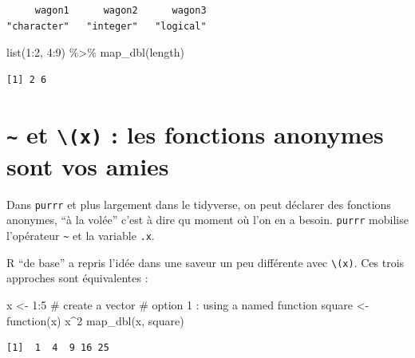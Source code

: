 \documentclass[
  letterpaper,
  DIV=11,
  numbers=noendperiod]{scrreprt}
\newenvironment{Shaded}{\begin{snugshade}}{\end{snugshade}}
\newcommand{\CommentTok}[1]{\textcolor[rgb]{0.37,0.37,0.37}{#1}}
\newcommand{\ControlFlowTok}[1]{\textcolor[rgb]{0.00,0.23,0.31}{#1}}
\newcommand{\DecValTok}[1]{\textcolor[rgb]{0.68,0.00,0.00}{#1}}
\newcommand{\FunctionTok}[1]{\textcolor[rgb]{0.28,0.35,0.67}{#1}}
\newcommand{\NormalTok}[1]{\textcolor[rgb]{0.00,0.23,0.31}{#1}}
\newcommand{\OtherTok}[1]{\textcolor[rgb]{0.00,0.23,0.31}{#1}}
\newcommand{\SpecialCharTok}[1]{\textcolor[rgb]{0.37,0.37,0.37}{#1}}
\begin{document}
\begin{verbatim}
     wagon1      wagon2      wagon3 
"character"   "integer"   "logical" 
\end{verbatim}

\begin{Shaded}
\begin{Highlighting}[]
\FunctionTok{list}\NormalTok{(}\DecValTok{1}\SpecialCharTok{:}\DecValTok{2}\NormalTok{, }\DecValTok{4}\SpecialCharTok{:}\DecValTok{9}\NormalTok{) }\SpecialCharTok{\%\textgreater{}\%} \FunctionTok{map\_dbl}\NormalTok{(length)}
\end{Highlighting}
\end{Shaded}

\begin{verbatim}
[1] 2 6
\end{verbatim}

\hypertarget{et-x-les-fonctions-anonymes-sont-vos-amies}{%
\section{\texorpdfstring{\texttt{\textasciitilde{}} et
\texttt{\textbackslash{}(x)} : les fonctions anonymes sont vos
amies}{\textasciitilde{} et \textbackslash(x) : les fonctions anonymes sont vos amies}}\label{et-x-les-fonctions-anonymes-sont-vos-amies}}

Dans \texttt{purrr} et plus largement dans le tidyverse, on peut
déclarer des fonctions anonymes, ``à la volée'' c'est à dire qu moment
où l'on en a besoin. \texttt{purrr} mobilise l'opérateur
\texttt{\textasciitilde{}} et la variable \texttt{.x}.

R ``de base'' a repris l'idée dans une saveur un peu différente avec
\texttt{\textbackslash{}(x)}. Ces trois approches sont équivalentes :

\begin{Shaded}
\begin{Highlighting}[]
\NormalTok{x }\OtherTok{\textless{}{-}} \DecValTok{1}\SpecialCharTok{:}\DecValTok{5} \CommentTok{\# create a vector}
\CommentTok{\# option 1 : using a named function}
\NormalTok{square }\OtherTok{\textless{}{-}} \ControlFlowTok{function}\NormalTok{(x) x}\SpecialCharTok{\^{}}\DecValTok{2}
\FunctionTok{map\_dbl}\NormalTok{(x, square)}
\end{Highlighting}
\end{Shaded}

\begin{verbatim}
[1]  1  4  9 16 25
\end{verbatim}
\end{document}
